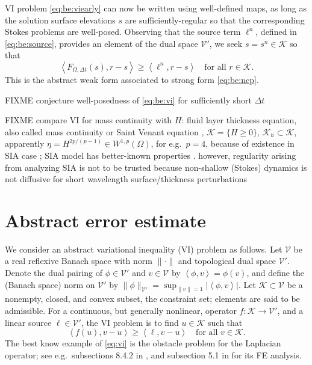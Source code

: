 \documentclass[hidelinks,onefignum,onetabnum,final]{siamart220329}  %
\newcommand{\cK}{\mathcal{K}}
\newcommand{\cV}{\mathcal{V}}
\newcommand{\ip}[2]{\left<#1,#2\right>}
\begin{document}
VI problem \eqref{eq:be:viearly} can now be written using well-defined maps, as long as the solution surface elevations $s$ are sufficiently-regular so that the corresponding Stokes problems are well-posed.  Observing that the source term $\ell^n$, defined in \eqref{eq:be:source}, provides an element of the dual space $\cV'$, we seek $s = s^n \in \cK$ so that
\begin{equation}
\ip{F_{\Omega,\Delta t}(s)}{r-s} \ge \ip{\ell^n}{r-s} \quad \text{for all } r \in \cK. \label{eq:be:vi}
\end{equation}
This is the abstract weak form associated to strong form \eqref{eq:be:ncp}.

FIXME conjecture well-posedness of \eqref{eq:be:vi} for sufficiently short $\Delta t$

FIXME compare VI for mass continuity with $H$: fluid layer thickness equation, also called mass continuity or Saint Venant equation \cite{JouvetBueler2012}, $\cK = \{H\ge 0\}$, $\cK_h \subset \cK$, apparently $\eta = H^{2p/(p-1)} \in W^{1,p}(\Omega)$, for e.g.~$p=4$, because of existence in SIA case \cite{JouvetBueler2012}; SIA model has better-known properties \cite{JouvetBueler2012,PiersantiTemam2023}. however, regularity arising from analyzing SIA is not to be trusted because non-shallow (Stokes) dynamics is not diffusive for short wavelength surface/thickness perturbations \cite{Pattynetal2008}


\section{Abstract error estimate} \label{sec:abstractestimate}

We consider an abstract variational inequality (VI) \cite{KinderlehrerStampacchia1980} problem as follows.  Let $\cV$ be a real reflexive Banach space with norm $\|\cdot\|$ and topological dual space $\cV'$.  Denote the dual pairing of $\phi \in \cV'$ and $v\in\cV$ by $\ip{\phi}{v} = \phi(v)$, and define the (Banach space) norm on $\cV'$ by $\|\phi\|_{\cV'} = \sup_{\|v\|=1} |\!\ip{\phi}{v}\!|$.  Let $\cK \subset \cV$ be a nonempty, closed, and convex subset, the constraint set; elements are said to be admissible.  For a continuous, but generally nonlinear, operator $f:\cK \to \cV'$, and a linear source $\ell\in \cV'$, the VI problem is to find $u\in \cK$ such that
\begin{equation}
\ip{f(u)}{v-u} \ge \ip{\ell}{v-u} \quad \text{for all } v\in \cK. \label{eq:vi}
\end{equation}
The best know example of \eqref{eq:vi} is the obstacle problem for the Laplacian operator; see e.g.~subsections 8.4.2 in \cite{Evans2010}, and subsection 5.1 in \cite{Ciarlet2002} for its FE analysis.
\end{document}
